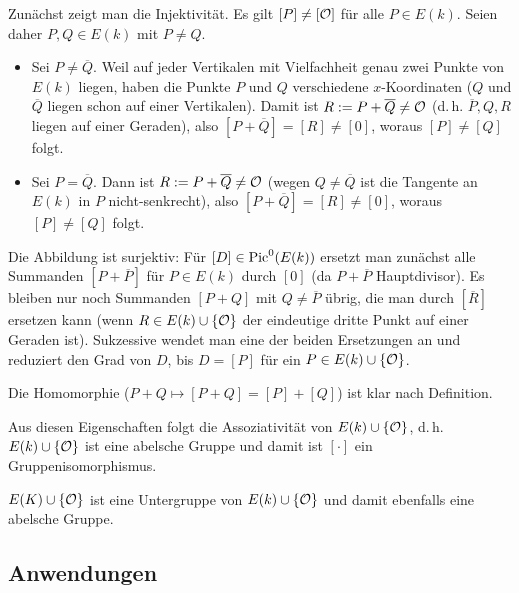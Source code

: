\begin{Beweis}
    Zunächst zeigt man die Injektivität.
    Es gilt $[P] \not= [\mathcal{O}]$ für alle $P \in E(k)$.
    Seien daher $P, Q \in E(k)$ mit $P \not= Q$.
    \begin{itemize}
        \item
        Sei $P \not= \overline{Q}$.
        Weil auf jeder Vertikalen mit Vielfachheit genau zwei Punkte von $E(k)$ liegen,
        haben die Punkte $P$ und $Q$ verschiedene $x$-Koordinaten
        ($Q$ und $\overline{Q}$ liegen schon auf einer Vertikalen).
        Damit ist $R := P + \overline{Q} \not= \mathcal{O}$
        (d.\,h. $\overline{P}, Q, R$ liegen auf einer Geraden),
        also $[P + \overline{Q}] = [R] \not= [0]$, woraus $[P] \not= [Q]$ folgt.
        
        \item
        Sei $P = \overline{Q}$.
        Dann ist $R := P + \overline{Q} \not= \mathcal{O}$
        (wegen $Q \not= \overline{Q}$ ist die Tangente an $E(k)$ in $P$ nicht-senkrecht),
        also $[P + \overline{Q}] = [R] \not= [0]$, woraus $[P] \not= [Q]$ folgt.
    \end{itemize}
    Die Abbildung ist surjektiv:
    Für $[D] \in \operatorname{Pic}^0(E(k))$ ersetzt man zunächst alle Summanden $[P + \overline{P}]$ für
    $P \in E(k)$ durch $[0]$ (da $P + \overline{P}$ Hauptdivisor).
    Es bleiben nur noch Summanden $[P + Q]$ mit $Q \not= \overline{P}$ übrig,
    die man durch $[\overline{R}]$ ersetzen kann (wenn $R \in E(k) \cup \{\mathcal{O}\}$ der eindeutige
    dritte Punkt auf einer Geraden ist).
    Sukzessive wendet man eine der beiden Ersetzungen an und reduziert den Grad von $D$,
    bis $D = [P]$ für ein $P \in E(k) \cup \{\mathcal{O}\}$.
    
    Die Homomorphie ($P + Q \mapsto [P + Q] = [P] + [Q]$) ist klar nach Definition.
    
    Aus diesen Eigenschaften folgt die Assoziativität von $E(k) \cup \{\mathcal{O}\}$, d.\,h.
    $E(k) \cup \{\mathcal{O}\}$ ist eine abelsche Gruppe und damit ist $[\cdot]$ ein Gruppenisomorphismus.
\end{Beweis}

\linie

$E(K) \cup \{\mathcal{O}\}$ ist eine Untergruppe von $E(k) \cup \{\mathcal{O}\}$ und damit ebenfalls eine
abelsche Gruppe.

\pagebreak

\subsection{%
    Anwendungen%
}

